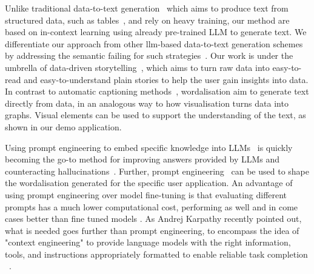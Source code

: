 \documentclass{article}
\begin{document}
Unlike traditional data-to-text generation~\cite{lin2024survey,puduppully2022data,osuji2024systematic, wiseman2019learning} which aims to produce text from structured data, such as tables~\cite{Iso2019learning}, and rely on heavy training, our method are based on in-context learning using already pre-trained LLM to generate text. We differentiate our approach from other llm-based data-to-text generation schemes by addressing the semantic failing for such strategies~\cite{kasner2024traditionalbenchmarks}. Our work is under the umbrella of data-driven storytelling~\cite{schroder2023telling,shao2024data,zhao2023stories}, which aims to turn raw data into easy-to-read and easy-to-understand plain stories to help the user gain insights into data. In contrast to automatic captioning methods~\cite{you2016image, Hossain2019comprehensive, herdade2020image}, %
wordalisation aim to generate text directly from data, in an analogous way to how visualisation turns data into graphs. Visual elements can be used to support the understanding of the text, as shown in our demo application. 

Using prompt engineering to embed specific knowledge into LLMs~\cite{ahmed2024prompt,liu2025fewshot,song2025injecting} is quickly becoming the go-to method for improving answers provided by LLMs and counteracting hallucinations~\cite{chen2024unleashing}. Further, prompt engineering~\cite{amatriain2024prompt,schulhoff2024prompt,liu2023pre} can be used to shape the wordalisation generated for the specific user application. An advantage of using prompt engineering over model fine-tuning is that evaluating different prompts has a much lower computational cost,  performing as well and in come cases better than fine tuned models \cite{liu2022few}.  As Andrej Karpathy recently pointed out, what is needed goes further than prompt engineering, to encompass the idea of "context engineering" to provide language models with the right information, tools, and instructions appropriately formatted to enable reliable task completion ~\cite{context_engineering}. 

\end{document}
